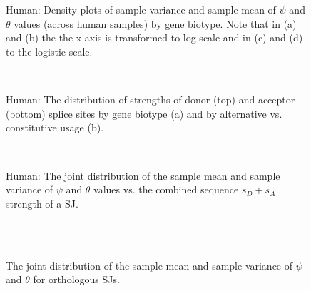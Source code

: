 \documentclass{article}
\begin{document}
\thispagestyle{empty}

\begin{figure}
\begin{center}
%
\\
%
\\
\caption{Human: Density plots of sample variance and sample mean of $\psi$ and $\theta$ values (across human samples) by gene biotype. 
Note that in (a) and (b) the the x-axis is transformed to log-scale and in (c) and (d) to the logistic scale.}
\end{center}
\end{figure}

\begin{figure}
\begin{center}
%
\\
\caption{Human: The distribution of strengths of donor (top) and acceptor (bottom) splice sites by gene biotype (a) and by alternative vs. constitutive usage (b).}
\end{center}
\end{figure}

\begin{figure}
\begin{center}
%
\\
%
\caption{Human: The joint distribution of the sample mean and sample variance of $\psi$ and $\theta$ values vs. the combined sequence $s_D+s_A$ strength of a SJ.} 
\end{center}
\end{figure}

\begin{figure}
\begin{center}
%
\\
%
\\
\caption{The joint distribution of the sample mean and sample variance of $\psi$ and $\theta$ for orthologous SJs.}
\end{center}
\end{figure}
\end{document}
